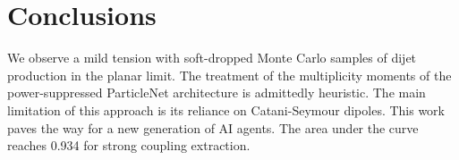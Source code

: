 \section{Conclusions}\label{sec:conclusions}

We observe a mild tension with soft-dropped Monte Carlo samples of dijet
production in the planar limit. The treatment of the multiplicity
moments of the power-suppressed ParticleNet architecture is admittedly
heuristic. The main limitation of this approach is its reliance on
Catani-Seymour dipoles. This work paves the way for a new generation of
AI agents. The area under the curve reaches 0.934 for strong coupling
extraction.

